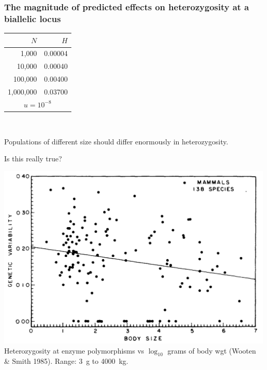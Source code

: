 \begin{frame}
\frametitle{The magnitude of predicted effects on heterozygosity at a
  biallelic locus}
{\centering\begin{tabular}{rr}
$N$ & $H$\\
\hline
    1,000 & 0.00004\\
   10,000 & 0.00040\\
  100,000 & 0.00400\\
1,000,000 & 0.03700\\
\hline
\multicolumn{2}{c}{$u = 10^{-8}$}\\
\end{tabular}\\}

\bigskip
Populations of different size should differ enormously in
heterozygosity. 

\pause

Is this really true?
\end{frame}

\begin{frame}
\centering%
\includegraphics[width=\textwidth]{wooten-hetz.pdf}\\
Heterozygosity at enzyme polymorphisms vs $\log_{10}$ grams of body wgt
(Wooten \& Smith 1985). Range: 3~g to 4000~kg.
\end{frame}

